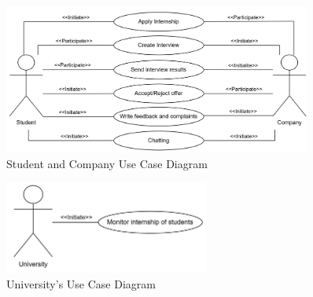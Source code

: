 \begin{figure}[H]
    \centering
    \includegraphics[width=0.9\textwidth]{Images/Use_Case_Diagrams/SandC_diagram.png}
    \caption{Student and Company Use Case Diagram}
\end{figure}
\begin{figure}[H]
    \centering
    \includegraphics[width=0.6\textwidth]{Images/Use_Case_Diagrams/University_diagram.png}
    \caption{University's Use Case Diagram}
\end{figure}


